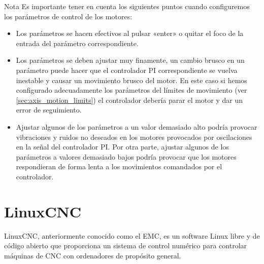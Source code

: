 \documentclass[english,spanish,a4paper,11pt]{article}
\begin{document}
\begin{admonition}{Nota}
    Es importante tener en cuenta los siguientes puntos cuando configuremos los parámetros de control de los motores:
    \begin{itemize}
        \item Los parámetros se hacen efectivos al pulsar «enter» o quitar el foco de la entrada del parámetro correspondiente.

        \item Los parámetros se deben ajustar muy finamente, un cambio brusco en un parámetro puede hacer que el controlador \ac{PI} correspondiente se vuelva inestable y causar un movimiento brusco del motor. En este caso si hemos configurado adecuadamente los parámetros del límites de movimiento (ver \cref{sec:axis_motion_limits}) el controlador debería parar el motor y dar un error de seguimiento.

        \item Ajustar algunos de los parámetros a un valor demasiado alto podría provocar vibraciones y ruidos no deseados en los motores provocados por oscilaciones en la señal del controlador \ac{PI}. Por otra parte, ajustar algunos de los parámetros a valores demasiado bajos podría provocar que los motores respondieran de forma lenta a los movimientos comandados por el controlador.
    \end{itemize}
\end{admonition}


\section{LinuxCNC}
\label{sec:linuxcnc}

LinuxCNC, anteriormente conocido como el \acf{EMC}, es un software Linux libre y de código abierto que proporciona un sistema de control numérico para controlar máquinas de \ac{CNC} con ordenadores de propósito general.
\end{document}
